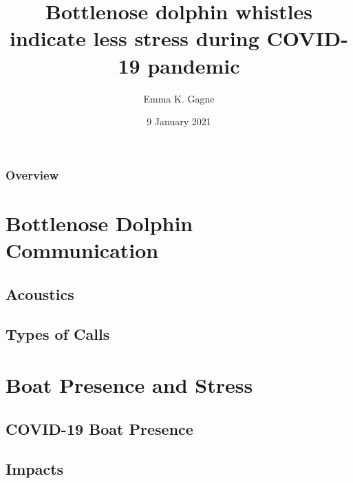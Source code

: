 \documentclass[12pt]{beamer}\usepackage[]{graphicx}\usepackage[]{color}
\title[Bioacoustics and Stress]{Bottlenose dolphin whistles indicate less stress during COVID-19 pandemic} %
\author{Emma K. Gagne} %
\institute[UVM] %
{
University of Vermont \\ %
Department of Biology \\
Burlington, VT 05401 USA \\ 
\medskip
\textit{emma.gagne@uvm.edu} %
}
\date{9 January 2021} %
\begin{document}
\begin{frame}
\titlepage %
\end{frame}


\begin{frame}
\frametitle{Overview} %
\tableofcontents %
\end{frame}

\section{Bottlenose Dolphin Communication} %

\subsection{Acoustics}
\subsection{Types of Calls} %

\section{Boat Presence and Stress}

\subsection{COVID-19 Boat Presence}
\subsection{Impacts}
\end{document}
